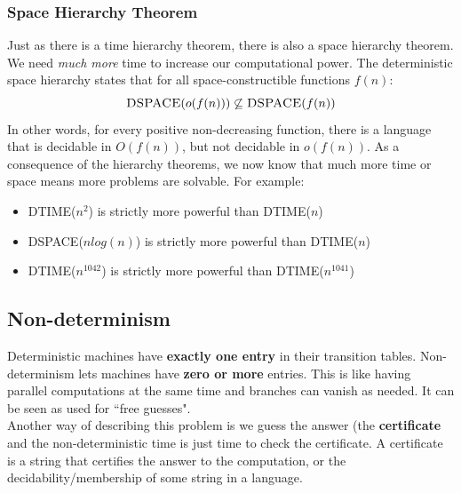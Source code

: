 \documentclass{article}
\theoremstyle{definition}
\newcommand{\n}[0]{\\[\baselineskip]}
\begin{document}
\subsubsection{Space Hierarchy Theorem}
Just as there is a time hierarchy theorem, there is also a space hierarchy theorem. We need \textit{much more} time to increase our computational power. The deterministic space hierarchy states that for all space-constructible functions $f(n)$:
\begin{equation}
\textsc{DSPACE}(o(f(n)))  \not\subseteq \textsc{DSPACE}(f(n))
\end{equation}
\noindent
In other words, for every positive non-decreasing function, there is a language that is decidable in $O(f(n))$, but not decidable in $o(f(n))$. As a consequence of the hierarchy theorems, we now know that much more time or space means more problems are solvable. For example:
\begin{itemize}
\item \textsc{DTIME}($n^2$) is strictly more powerful than \textsc{DTIME}($n$)
\item \textsc{DSPACE}($nlog(n)$) is strictly more powerful than \textsc{DTIME}($n$)
\item \textsc{DTIME}($n^1042$) is strictly more powerful than \textsc{DTIME}($n^1041$)
\end{itemize}

\subsection{Non-determinism}
Deterministic machines have \textbf{exactly one entry} in their transition tables. Non-determinism lets machines have \textbf{zero or more} entries. This is like having parallel computations at the same time and branches can vanish as needed. It can be seen as used for ``free guesses".
\n
Another way of describing this problem is we guess the answer (the \textbf{certificate} and the non-deterministic time is just time to check the certificate. A certificate is a string that certifies the answer to the computation, or the decidability/membership of some string in a language.
\end{document}
